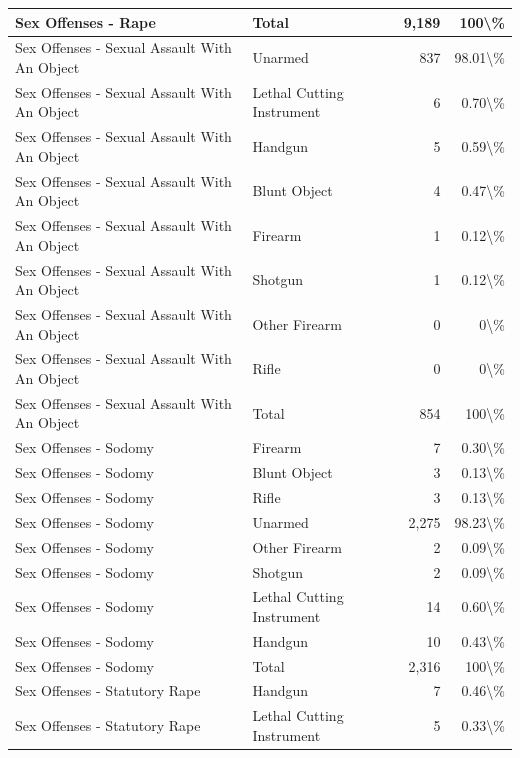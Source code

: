\documentclass[
]{krantz}
\begin{document}
\begin{longtable}[t]{l|l|r|r}
\hline
Sex Offenses - Rape & Total & 9,189 & 100\textbackslash{}\%\\
\hline
Sex Offenses - Sexual Assault With An Object & Unarmed & 837 & 98.01\textbackslash{}\%\\
\hline
Sex Offenses - Sexual Assault With An Object & Lethal Cutting Instrument & 6 & 0.70\textbackslash{}\%\\
\hline
Sex Offenses - Sexual Assault With An Object & Handgun & 5 & 0.59\textbackslash{}\%\\
\hline
Sex Offenses - Sexual Assault With An Object & Blunt Object & 4 & 0.47\textbackslash{}\%\\
\hline
Sex Offenses - Sexual Assault With An Object & Firearm & 1 & 0.12\textbackslash{}\%\\
\hline
Sex Offenses - Sexual Assault With An Object & Shotgun & 1 & 0.12\textbackslash{}\%\\
\hline
Sex Offenses - Sexual Assault With An Object & Other Firearm & 0 & 0\textbackslash{}\%\\
\hline
Sex Offenses - Sexual Assault With An Object & Rifle & 0 & 0\textbackslash{}\%\\
\hline
Sex Offenses - Sexual Assault With An Object & Total & 854 & 100\textbackslash{}\%\\
\hline
Sex Offenses - Sodomy & Firearm & 7 & 0.30\textbackslash{}\%\\
\hline
Sex Offenses - Sodomy & Blunt Object & 3 & 0.13\textbackslash{}\%\\
\hline
Sex Offenses - Sodomy & Rifle & 3 & 0.13\textbackslash{}\%\\
\hline
Sex Offenses - Sodomy & Unarmed & 2,275 & 98.23\textbackslash{}\%\\
\hline
Sex Offenses - Sodomy & Other Firearm & 2 & 0.09\textbackslash{}\%\\
\hline
Sex Offenses - Sodomy & Shotgun & 2 & 0.09\textbackslash{}\%\\
\hline
Sex Offenses - Sodomy & Lethal Cutting Instrument & 14 & 0.60\textbackslash{}\%\\
\hline
Sex Offenses - Sodomy & Handgun & 10 & 0.43\textbackslash{}\%\\
\hline
Sex Offenses - Sodomy & Total & 2,316 & 100\textbackslash{}\%\\
\hline
Sex Offenses - Statutory Rape & Handgun & 7 & 0.46\textbackslash{}\%\\
\hline
Sex Offenses - Statutory Rape & Lethal Cutting Instrument & 5 & 0.33\textbackslash{}\%\\

\end{longtable}
\end{document}
